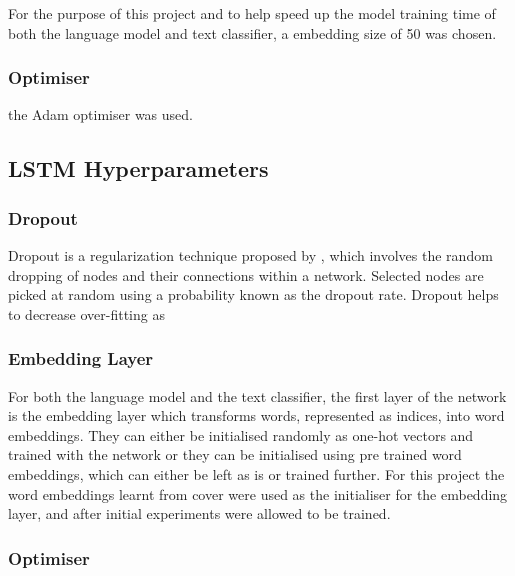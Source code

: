 For the purpose of this project and to help speed up the model training time of both the language model and text classifier, a embedding size of 50 was chosen.
\subsubsection{Optimiser}
the Adam optimiser was used.
\subsection{LSTM Hyperparameters}
\subsubsection{Dropout}
Dropout is a regularization technique proposed by \cite{Srivastava2014}, which involves the random dropping of nodes and their connections within a network. Selected nodes are picked at random using a probability known as the dropout rate. Dropout helps to decrease over-fitting as 
\subsubsection{Embedding Layer}
For both the language model and the text classifier, the first layer of the network is the embedding layer which transforms words, represented as indices, into word embeddings. They can either be initialised randomly as one-hot vectors and trained with the network or they can be initialised using pre trained word embeddings, which can either be left as is or trained further. For this project the word embeddings learnt from cover were used as the initialiser for the embedding layer, and after initial experiments were allowed to be trained.
\subsubsection{Optimiser}


